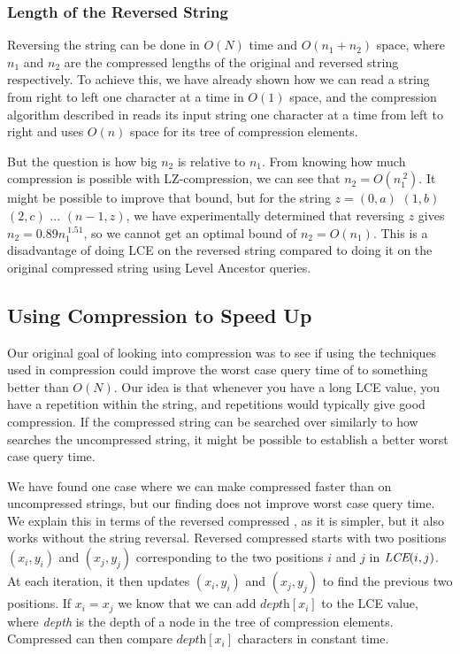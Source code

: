 \documentclass[a4]{article}
\newcommand*{\pref}{\prettyref}
\begin{document}
\subsubsection{Length of the Reversed String}

Reversing the string can be done in $O(N)$ time and $O(n_1 + n_2)$ space, where $n_1$ and $n_2$ are the compressed lengths of the original and reversed string respectively. To achieve this, we have already shown how we can read a string from right to left one character at a time in $O(1)$ space, and the compression algorithm described in \pref{sec:lz-definition} reads its input string one character at a time from left to right and uses $O(n)$ space for its tree of compression elements.

But the question is how big $n_2$ is relative to $n_1$. From knowing how much compression is possible with LZ-compression, we can see that $n_2=O(n_1^{~2})$. It might be possible to improve that bound, but for the string $z=(0,a)$ $(1,b)$ $(2,c)$ $...$ $(n-1,z)$, we have experimentally determined that reversing $z$ gives $n_2=0.89n_1^{~1.51}$, so we cannot get an optimal bound of $n_2=O(n_1)$. This is a disadvantage of doing LCE on the reversed string compared to doing it on the original compressed string using Level Ancestor queries.

\subsection{Using Compression to Speed Up }

Our original goal of looking into compression was to see if using the techniques used in compression could improve the worst case query time of  to something better than $O(N)$. Our idea is that whenever you have a long LCE value, you have a repetition within the string, and repetitions would typically give good compression. If the compressed string can be searched over similarly to how  searches the uncompressed string, it might be possible to establish a better worst case query time.

We have found one case where we can make compressed  faster than  on uncompressed strings, but our finding does not improve worst case query time. We explain this in terms of the reversed compressed , as it is simpler, but it also works without the string reversal. Reversed compressed  starts with two positions $(x_i,y_i)$ and $(x_j,y_j)$ corresponding to the two positions $i$ and $j$ in $\textit{LCE}(i,j)$. At each iteration, it then updates $(x_i,y_i)$ and $(x_j,y_j)$ to find the previous two positions. If $x_i = x_j$ we know that we can add $\textit{depth}[x_i]$ to the LCE value, where \textit{depth} is the depth of a node in the tree of compression elements. Compressed  can then compare $\textit{depth}[x_i]$ characters in constant time.
\end{document}

